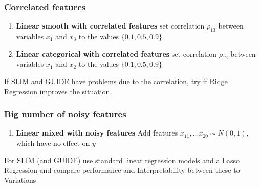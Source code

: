 \color{black}


\subsubsection{Correlated features}

\begin{enumerate}
    \item \textbf{Linear smooth with correlated features} set correlation $\rho_{13}$ between  variables $x_1$ and $x_3$ to the values $\{0.1, 0.5, 0.9\}$
   
    \item \textbf{Linear categorical with correlated features} set correlation $\rho_{12}$ between  variables $x_1$ and $x_2$ to the values $\{0.1, 0.5, 0.9\}$
\end{enumerate}
If SLIM and GUIDE have problems due to the correlation, try if Ridge Regression improves the situation.

\subsubsection{Big number of noisy features}
\begin{enumerate}
    \item \textbf{Linear mixed with noisy features}
    Add features $x_{11}, ... x_{20} \sim N(0,1)$, which have no effect on $y$
\end{enumerate}

For SLIM (and GUIDE) use standard linear regression models and a Lasso Regression and compare performance and Interpretability between these to Variations

